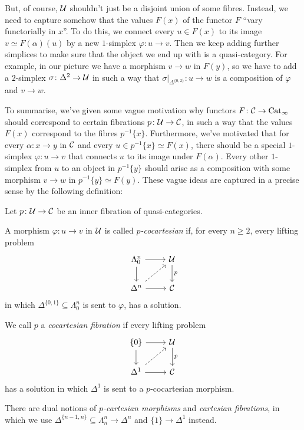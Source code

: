 \begin{numpar}
\begin{center}
	\end{center}
	But, of course, $\mathcal{U}$ shouldn't just be a disjoint union of some fibres. Instead, we need to capture somehow that the values $F(x)$ of the functor $F$ \enquote{vary functorially in $x$}. To do this, we connect every $u\in F(x)$ to its image $v\simeq F(\alpha)(u)$ by a new $1$-simplex $\varphi\colon u\rightarrow v$. Then we keep adding further simplices to make sure that the object we end up with is a quasi-category. For example, in our picture we have a morphism $v\rightarrow w$ in $F(y)$, so we have to add a $2$-simplex $\sigma\colon \Delta^2\rightarrow \mathcal{U}$ in such a way that $\sigma|_{\Delta^{\{0,2\}}}\colon u\rightarrow w$ is a composition of $\varphi$ and $v\rightarrow w$.
	
	To summarise, we've given some vague motivation why functors $F\colon \mathcal{C}\rightarrow\mathrm{Cat}_\infty$ should correspond to certain fibrations $p\colon \mathcal{U}\rightarrow \mathcal{C}$, in such a way that the values $F(x)$ correspond to the fibres $p^{-1}\{x\}$. Furthermore, we've motivated that for every $\alpha\colon x\rightarrow y$ in $\mathcal{C}$ and every $u\in p^{-1}\{x\}\simeq F(x)$, there should be a special $1$-simplex $\varphi\colon u\rightarrow v$ that connects $u$ to its image under $F(\alpha)$. Every other $1$-simplex from $u$ to an object in $p^{-1}\{y\}$ should arise as a composition with some morphism $v\rightarrow w$ in $p^{-1}\{y\}\simeq F(y)$. These vague ideas are captured in a precise sense by the following definition:
\end{numpar}
\begin{defi}\label{def:Cocartesian}
	Let $p\colon \mathcal{U}\rightarrow\mathcal{C}$ be an inner fibration of quasi-categories.
	\begin{alphanumerate}
		\item A morphism $\varphi\colon u\rightarrow v$ in $\mathcal{U}$ is called \emph{$p$-cocartesian} if, for every $n\geqslant 2$, every lifting problem\label{enum:CocartesianMorphism}
		\begin{equation*}
			\begin{tikzcd}
				\Lambda_0^n\rar\dar & \Uu\dar["p"]\\
				\Delta^n\urar[dashed]\rar & \Cc
			\end{tikzcd}
		\end{equation*}
		in which $\Delta^{\{0,1\}}\subseteq \Lambda_0^n$ is sent to $\varphi$, has a solution.
		\item We call $p$ a \emph{cocartesian fibration} if every lifting problem\label{enum:CocartesianFibration}
		\begin{equation*}
			\begin{tikzcd}
				\{0\}\rar\dar & \Uu\dar["p"]\\
				\Delta^1\urar[dashed]\rar & \Cc
			\end{tikzcd}
		\end{equation*}
		has a solution in which $\Delta^1$ is sent to a $p$-cocartesian morphism.
	\end{alphanumerate}
	There are dual notions of \emph{$p$-cartesian morphisms} and \emph{cartesian fibrations}, in which we use $\Delta^{\{n-1,n\}}\subseteq \Lambda_n^n\rightarrow \Delta^n$ and $\{1\}\rightarrow \Delta^1$ instead.
\end{defi}
